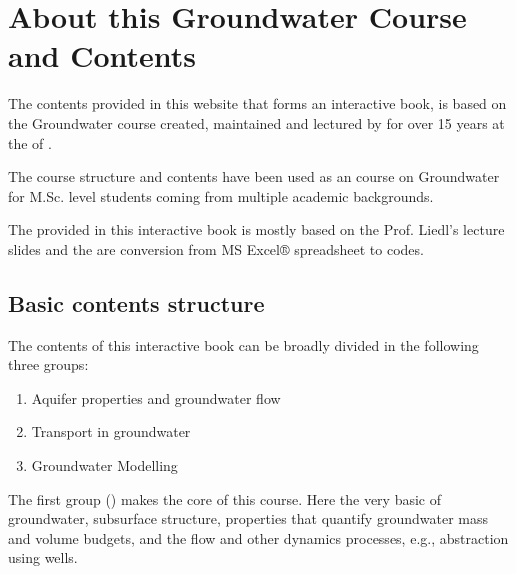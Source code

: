 \documentclass[letterpaper,10pt,english]{sphinxmanual}
\begin{document}
\section{About this Groundwater Course and Contents}
\label{\detokenize{contents/background/00_general:about-this-groundwater-course-and-contents}}\label{\detokenize{contents/background/00_general::doc}}
The contents provided in this website that forms an interactive book, is based on the Groundwater course created, maintained and lectured by
 for over 15 years at the  of .

The course structure and contents have been used as an  course on Groundwater for M.Sc. level students coming from multiple academic backgrounds.

The  provided in this interactive book is mostly based on the Prof. Liedl’s lecture slides and the  are conversion from MS Excel® spreadsheet to  codes.
\begin{quote}

\end{quote}


\subsection{Basic contents structure}
\label{\detokenize{contents/background/00_general:basic-contents-structure}}
The contents of this interactive book can be broadly divided in the following three groups:
\begin{enumerate}
%
\item {} 
Aquifer properties and groundwater flow

\item {} 
Transport in groundwater

\item {} 
Groundwater Modelling

\end{enumerate}

The first group () makes the core of this course. Here the very basic of groundwater, subsurface structure, properties that quantify groundwater mass and volume budgets, and the flow and other dynamics processes, e.g., abstraction using wells.
\end{document}
